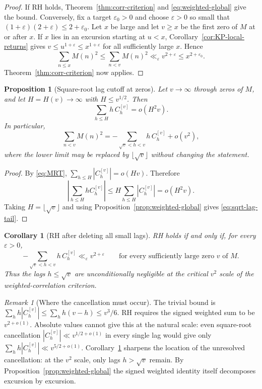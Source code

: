 \documentclass[11pt]{amsart}
\numberwithin{equation}{section}
\theoremstyle{plain}
\newtheorem{proposition}[theorem]{Proposition}
\newtheorem{corollary}[theorem]{Corollary}
\theoremstyle{definition}
\theoremstyle{remark}
\newtheorem{remark}[theorem]{Remark}
\newcommand{\eps}{\varepsilon}
\begin{document}
\begin{proof}
If RH holds, Theorem~\ref{thm:corr-criterion} and
\eqref{eq:weighted-global} give the bound. Conversely, fix a target
$\eps_0>0$ and choose $\eps>0$ so small that
$(1+\eps)(2+\eps)\le2+\eps_0$. Let $x$ be large and let $v\ge x$ be the
first zero of $M$ at or after $x$. If $x$ lies in an excursion starting at
$u<x$, Corollary~\ref{cor:KP-local-returns} gives $v\le u^{1+\eps}\le
x^{1+\eps}$ for all sufficiently large $x$. Hence
\[
\sum_{n\le x}M(n)^2\le\sum_{n<v}M(n)^2
\ll_\eps v^{2+\eps}\le x^{2+\eps_0}.
\]
Theorem~\ref{thm:corr-criterion} now applies.
\end{proof}

\begin{proposition}[Square-root lag cutoff at zeros]
\label{prop:sqrt-lag-cutoff}
Let $v\to\infty$ through zeros of $M$, and let $H=H(v)\to\infty$ with
$H\le v^{1/2}$. Then
\begin{equation}
\label{eq:small-lag-weighted}
\sum_{h\le H}h\,C_h^{[v]}=o(H^2v).
\end{equation}
In particular,
\begin{equation}
\label{eq:sqrt-lag-tail}
\sum_{n<v}M(n)^2
=-\sum_{\sqrt v<h<v}h\,C_h^{[v]}+o(v^2),
\end{equation}
where the lower limit may be replaced by $\lfloor\sqrt v\rfloor$ without
changing the statement.
\end{proposition}

\begin{proof}
By \eqref{eq:MRT},
$\sum_{h\le H}|C_h^{[v]}|=o(Hv)$. Therefore
\[
\left|\sum_{h\le H}hC_h^{[v]}\right|
\le H\sum_{h\le H}|C_h^{[v]}|=o(H^2v).
\]
Taking $H=\lfloor\sqrt v\rfloor$ and using
Proposition~\ref{prop:weighted-global} gives \eqref{eq:sqrt-lag-tail}.
\end{proof}

\begin{corollary}[RH after deleting all small lags]
\label{cor:RH-large-lags}
RH holds if and only if, for every $\eps>0$,
\[
-\sum_{\sqrt v<h<v}h\,C_h^{[v]}\ll_\eps v^{2+\eps}
\qquad\text{for every sufficiently large zero $v$ of $M$.}
\]
Thus the lags $h\le\sqrt v$ are unconditionally negligible at the critical
$v^2$ scale of the weighted-correlation criterion.
\end{corollary}

\begin{remark}[Where the cancellation must occur]
\label{rem:cross-lag}
The trivial bound is $\sum_hh|C^{[v]}_h|\le\sum_hh(v-h)\le v^3/6$.
RH requires the signed weighted sum to be $v^{2+o(1)}$. Absolute values
cannot give this at the natural scale: even square-root cancellation
$|C^{[v]}_h|\ll v^{1/2+o(1)}$ in every single lag would give only
$\sum_hh|C^{[v]}_h|\ll v^{5/2+o(1)}$. Corollary~\ref{cor:RH-large-lags}
sharpens the location of the unresolved cancellation: at the $v^2$ scale,
only lags $h>\sqrt v$ remain. By Proposition~\ref{prop:weighted-global} the
signed weighted identity itself decomposes excursion by excursion.
\end{remark}
\end{document}
